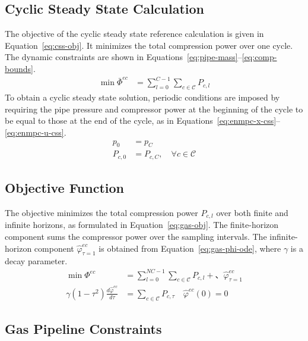 \documentclass[11pt]{article}
\begin{document}
\subsection{Cyclic Steady State Calculation}

The objective of the cyclic steady state reference calculation is given in Equation~\eqref{eq:css-obj}. It minimizes the total compression power over one cycle. The dynamic constraints are shown in Equations~\eqref{eq:pipe-mass}--\eqref{eq:comp-bounds}.
\begin{align}
\min \bar{\Phi}^{ec} &= \sum_{l=0}^{C-1} \sum_{c \in \mathcal{C}} P_{c,l} \label{eq:css-obj}
\end{align}
To obtain a cyclic steady state solution, periodic conditions are imposed by requiring the pipe pressure and compressor power at the beginning of the cycle to be equal to those at the end of the cycle, as in Equations~\eqref{eq:enmpc-x-css}--\eqref{eq:enmpc-u-css}.
\begin{align}
p_0 &= p_C \label{eq:enmpc-x-css}\\
P_{c,0} &= P_{c,C}, \quad \forall c \in \mathcal{C} \label{eq:enmpc-u-css}
\end{align}

\subsection{Objective Function}

The objective minimizes the total compression power $P_{c,l}$ over both finite and infinite horizons, as formulated in Equation~\eqref{eq:gas-obj}. The finite-horizon component sums the compressor power over the sampling intervals. The infinite-horizon component $\hat{\varphi}^{ec}_{\tau=1}$ is obtained from Equation~\eqref{eq:gas-phi-ode}, where $\gamma$ is a decay parameter.
\begin{align}
\min \Phi^{ec} &= \sum_{l=0}^{NC-1} \sum_{c \in \mathcal{C}} P_{c,l} + 、\hat{\varphi}^{ec}_{\tau=1} \label{eq:gas-obj} \\
\gamma(1-\tau^2)\frac{d\hat{\varphi}^{ec}}{d\tau} &= \sum_{c \in \mathcal{C}} P_{c,\tau} \quad \hat{\varphi}^{ec}(0) = 0 \label{eq:gas-phi-ode}
\end{align}

\subsection{Gas Pipeline Constraints}
\end{document}
